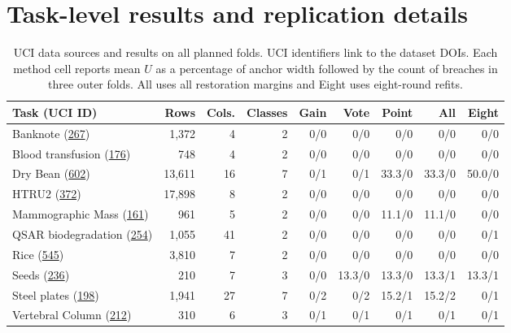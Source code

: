 \section{Task-level results and replication details}
\label{sec:transport-details}
\begin{table}[htb]
\centering
\caption{UCI data sources and results on all planned folds. UCI identifiers link to the dataset DOIs. Each method cell reports mean $U$ as a percentage of anchor width followed by the count of breaches in three outer folds. All uses all restoration margins and Eight uses eight-round refits.}
\label{tab:transport-tasks}
\small\setlength{\tabcolsep}{3.4pt}
\begin{tabular}{@{}lrrr rrrrr@{}}
\toprule
Task (UCI ID) & Rows & Cols. & Classes & Gain & Vote & Point & All & Eight\\
\midrule
Banknote (\href{https://doi.org/10.24432/C55P57}{267})&1,372&4&2&0/0&0/0&0/0&0/0&0/0\\
Blood transfusion (\href{https://doi.org/10.24432/C5GS39}{176})&748&4&2&0/0&0/0&0/0&0/0&0/0\\
Dry Bean (\href{https://doi.org/10.24432/C50S4B}{602})&13,611&16&7&0/1&0/1&33.3/0&33.3/0&50.0/0\\
HTRU2 (\href{https://doi.org/10.24432/C5DK6R}{372})&17,898&8&2&0/0&0/0&0/0&0/0&0/0\\
Mammographic Mass (\href{https://doi.org/10.24432/C53K6Z}{161})&961&5&2&0/0&0/0&11.1/0&11.1/0&0/0\\
QSAR biodegradation (\href{https://doi.org/10.24432/C5H60M}{254})&1,055&41&2&0/0&0/0&0/0&0/0&0/1\\
Rice (\href{https://doi.org/10.24432/C5MW4Z}{545})&3,810&7&2&0/0&0/0&0/0&0/0&0/0\\
Seeds (\href{https://doi.org/10.24432/C5H30K}{236})&210&7&3&0/0&13.3/0&13.3/0&13.3/1&13.3/1\\
Steel plates (\href{https://doi.org/10.24432/C5J88N}{198})&1,941&27&7&0/2&0/2&15.2/1&15.2/2&0/1\\
Vertebral Column (\href{https://doi.org/10.24432/C5K89B}{212})&310&6&3&0/1&0/1&0/1&0/1&0/1\\
\bottomrule
\end{tabular}
\end{table}

